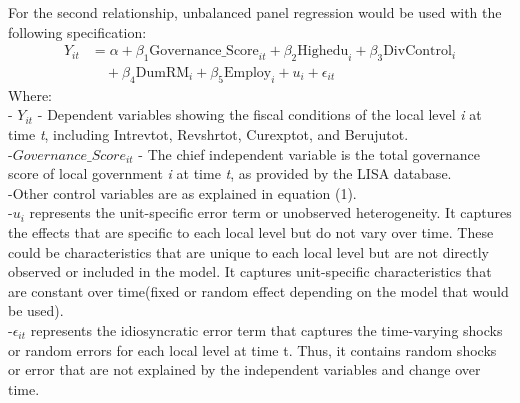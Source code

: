 For the second relationship, unbalanced panel regression would be used with the following specification:
\begin{align}
Y_{it} &= \alpha + \beta_1 \text{Governance\_Score}_{it} + \beta_2 \text{Highedu}_i + \beta_3 \text{DivControl}_i \nonumber \\ &\quad + \beta_4 \text{DumRM}_i + \beta_5 \text{Employ}_i + u_i + \epsilon_{it}
\end{align}
Where:\\
- \(Y_{it}\) - Dependent variables showing the fiscal conditions of the local level \emph{i} at time \emph{t}, including Intrevtot, Revshrtot, Curexptot, and Berujutot.\\
-\(Governance\_Score_{it}\) - The chief independent variable is the total governance score of local government \emph{i} at time \emph{t}, as provided by the LISA database.\\
-Other control variables are as explained in equation (1).\\
-\(u_{i}\) represents the unit-specific error term or unobserved heterogeneity. It captures the effects that are specific to each local level but do not vary over time. These could be characteristics that are unique to each local level but are not directly observed or included in the model. It captures unit-specific characteristics that are constant over time(fixed or random effect depending on the model that would be used).\\
-\(\epsilon_{it}\) represents the idiosyncratic error term that captures the time-varying shocks or random errors for each local level at time t. Thus, it contains random shocks or error that are not explained by the independent variables and change over time. \\


